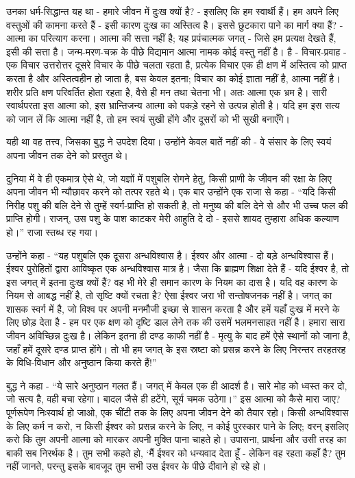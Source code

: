 उनका धर्म-सिद्धान्त यह था - हमारे जीवन में दुःख क्यों है? - इसलिए कि हम स्वार्थी हैं। हम अपने लिए वस्तुओं की कामना करते हैं - इसी कारण दुःख का अस्तित्व है। इससे छुटकारा पाने का मार्ग क्या हैं? - आत्मा का परित्याग करना। आत्मा की सत्ता नहीं है; यह प्रपंचात्मक जगत् - जिसे हम प्रत्यक्ष देखते हैं, इसी की सत्ता है। जन्म-मरण-चक्र के पीछे विद्यमान आत्मा नामक कोई वस्तु नहीं है। है - विचार-प्रवाह - एक विचार उत्तरोत्तर दूसरे विचार के पीछे चलता रहता है, प्रत्येक विचार एक ही क्षण में अस्तित्व को प्राप्त करता है और अस्तित्वहीन हो जाता है, बस केवल इतना; विचार का कोई ज्ञाता नहीं है, आत्मा नहीं है। शरीर प्रति क्षण परिवर्तित होता रहता है, वैसे ही मन तथा चेतना भी। अतः आत्मा एक भ्रम है। सारी स्वार्थपरता इस आत्मा को, इस भ्रान्तिजन्य आत्मा को पकड़े रहने से उत्पन्न होती है। यदि हम इस सत्य को जान लें कि आत्मा नहीं है, तो हम स्वयं सुखी होंगे और दूसरों को भी सुखी बनाएँगे। 

यही था वह तत्त्व, जिसका बुद्ध ने उपदेश दिया। उन्होंने केवल बातें नहीं की - वे संसार के लिए स्वयं अपना जीवन तक देने को प्रस्तुत थे।\endnotemark[\theendnote] 

दुनिया में वे ही एकमात्र ऐसे थे, जो यज्ञों में पशुबलि रोगने हेतु, किसी प्राणी के जीवन की रक्षा के लिए अपना जीवन भी न्यौछावर करने को तत्पर रहते थे। एक बार उन्होंने एक राजा से कहा - “यदि किसी निरीह पशु की बलि देने से तुम्हें स्वर्ग-प्राप्ति हो सकती है, तो मनुष्य की बलि देने से और भी उच्च फल की प्राप्ति होगी। राजन्, उस पशु के पाश काटकर मेरी आहुति दे दो - इससे शायद तुम्हारा अधिक कल्याण हो।” राजा स्तब्ध रह गया। 

उन्होंने कहा - “यह पशुबलि एक दूसरा अन्धविश्वास है। ईश्वर और आत्मा - दो बड़े अन्धविश्वास हैं। ईश्वर पुरोहितों द्वारा आविष्कृत एक अन्धविश्वास मात्र है। जैसा कि ब्राह्मण शिक्षा देते हैं - यदि ईश्वर है, तो इस जगत् में इतना दुःख क्यों हैं? वह भी मेरे ही समान कारण के नियम का दास है। यदि वह कारण के नियम से आबद्ध नहीं है, तो सृष्टि क्यों रचता है? ऐसा ईश्वर जरा भी सन्तोषजनक नहीं है। जगत् का शासक स्वर्ग में है, जो विश्व पर अपनी मनमौजी इच्छा से शासन करता है और हमें यहाँ दुःख में मरने के लिए छोड़ देता है - हम पर एक क्षण को दृष्टि डाल लेने तक की उसमें भलमनसाहत नहीं है। हमारा सारा जीवन अविच्छिन्न दुःख है। लेकिन इतना ही दण्ड काफी नहीं है - मृत्यु के बाद हमें ऐसे स्थानों को जाना है, जहाँ हमें दूसरे दण्ड प्राप्त होंगे। तो भी हम जगत् के इस स्रष्टा को प्रसन्न करने के लिए निरन्तर तरहतरह के विधि-विधान और अनुष्ठान किया करते हैं!” 

बुद्ध ने कहा - “ये सारे अनुष्ठान गलत हैं। जगत् में केवल एक ही आदर्श है। सारे मोह को ध्वस्त कर दो, जो सत्य है, वही बचा रहेगा। बादल जैसे ही हटेंगे, सूर्य चमक उठेगा।” इस आत्मा को कैसे मारा जाए? पूर्णरूपेण निःस्वार्थ हो जाओ, एक चींटी तक के लिए अपना जीवन देने को तैयार रहो। किसी अन्धविश्वास के लिए कर्म न करो, न किसी ईश्वर को प्रसन्न करने के लिए, न कोई पुरस्कार पाने के लिए; वरन् इसलिए करो कि तुम अपनी आत्मा को मारकर अपनी मुक्ति पाना चाहते हो। उपासना, प्रार्थना और उसी तरह का बाकी सब निरर्थक है। तुम सभी कहते हो, ‘मैं ईश्वर को धन्यवाद देता हूँ - लेकिन वह रहता कहाँ है? तुम नहीं जानते, परन्तु इसके बावजूद तुम सभी उस ईश्वर के पीछे दीवाने हो रहे हो। 

